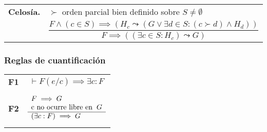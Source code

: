 \begin{tabular}{ll}
    \textbf{Celosía.}
    &  $\succ$ orden parcial bien definido sobre $S \neq \emptyset$ \\
    & 
    \begin{minipage}{0.5\linewidth}
    \begin{equation*}
        \frac{F \land (c \in S) \implies (H_c \leadsto (G \lor \exists d \in S : (c \succ d) \land H_d))}{F \implies ((\exists c \in S : H_c) \leadsto G)}
    \end{equation*}
    \end{minipage} \\
\end{tabular}

\subsubsection{Reglas de cuantificación}
\begin{tabular}{ll}
    \textbf{F1} & 
    \begin{minipage}{0.5\linewidth}
    \begin{equation*}
        \vdash F(e/c) \implies \exists c : F
    \end{equation*}
    \end{minipage} \\[10pt]
    \textbf{F2} & 
    \begin{minipage}{0.5\linewidth}
    \begin{equation*}
    \begin{array}{l}
        F \implies G \\
        \text{c no ocurre libre en} \hspace{0.2cm} G \\
        \hline
        (\exists c : F) \implies G
    \end{array}
    \end{equation*}
    \end{minipage}
\end{tabular}

